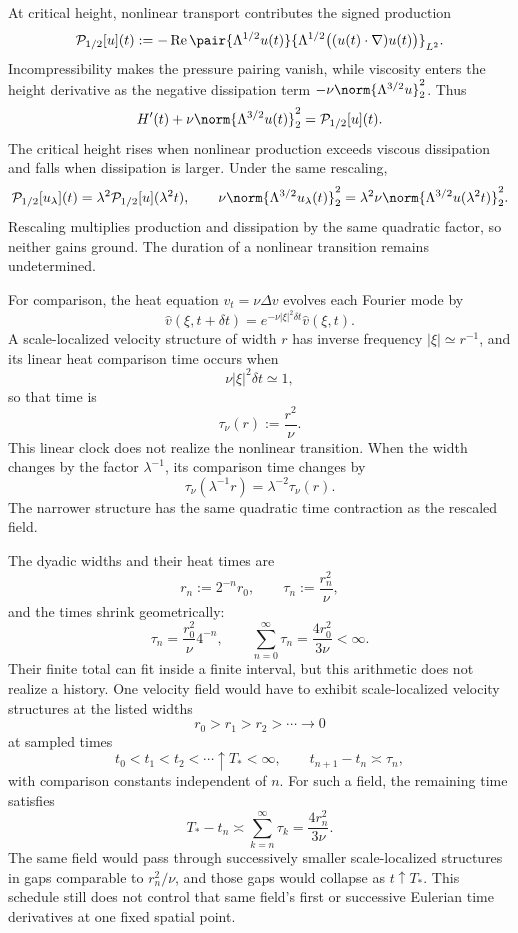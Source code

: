 
At critical height, nonlinear transport contributes the signed production
\[
  \mathcal P_{1/2}[u](t)
  :=
  -\operatorname{Re}
  \pair
    {\Lambda^{1/2}u(t)}
    {\Lambda^{1/2}\bigl((u(t)\cdot\nabla)u(t)\bigr)}_{L^2}.
\]
Incompressibility makes the pressure pairing vanish, while viscosity enters the height derivative as the negative dissipation term \(-\nu\norm{\Lambda^{3/2}u}_2^2\).
Thus
\[
  H'(t)
  +
  \nu\norm{\Lambda^{3/2}u(t)}_2^2
  =
  \mathcal P_{1/2}[u](t).
\]
The critical height rises when nonlinear production exceeds viscous dissipation and falls when dissipation is larger.
Under the same rescaling,
\[
  \mathcal P_{1/2}[u_\lambda](t)
  =
  \lambda^2\mathcal P_{1/2}[u](\lambda^2t),
  \qquad
  \nu\norm{\Lambda^{3/2}u_\lambda(t)}_2^2
  =
  \lambda^2\nu\norm{\Lambda^{3/2}u(\lambda^2t)}_2^2.
\]
Rescaling multiplies production and dissipation by the same quadratic factor, so neither gains ground.
The duration of a nonlinear transition remains undetermined.


For comparison, the heat equation \(v_t=\nu\Delta v\) evolves each Fourier mode by
\[
  \widehat v(\xi,t+\delta t)
  =
  e^{-\nu|\xi|^2\delta t}\widehat v(\xi,t).
\]
A scale-localized velocity structure of width \(r\) has inverse frequency \(|\xi|\simeq r^{-1}\), and its linear heat comparison time occurs when
\[
  \nu|\xi|^2\delta t\simeq1,
\]
so that time is
\[
  \tau_\nu(r)
  :=
  \frac{r^2}{\nu}.
\]
This linear clock does not realize the nonlinear transition.
When the width changes by the factor \(\lambda^{-1}\), its comparison time changes by
\[
  \tau_\nu(\lambda^{-1}r)
  =
  \lambda^{-2}\tau_\nu(r).
\]
The narrower structure has the same quadratic time contraction as the rescaled field.


The dyadic widths and their heat times are
\[
  r_n:=2^{-n}r_0,
  \qquad
  \tau_n:=\frac{r_n^2}{\nu},
\]
and the times shrink geometrically:
\[
  \tau_n
  =
  \frac{r_0^2}{\nu}4^{-n},
  \qquad
  \sum_{n=0}^{\infty}\tau_n
  =
  \frac{4r_0^2}{3\nu}
  <
  \infty.
\]
Their finite total can fit inside a finite interval, but this arithmetic does not realize a \NavierStokes{} history.
One \NavierStokes{} velocity field would have to exhibit scale-localized velocity structures at the listed widths
\[
  r_0>r_1>r_2>\cdots\longrightarrow0
\]
at sampled times
\[
  t_0<t_1<t_2<\cdots\uparrow T_*<\infty,
  \qquad
  t_{n+1}-t_n\asymp\tau_n,
\]
with comparison constants independent of \(n\).
For such a field, the remaining time satisfies
\[
  T_*-t_n
  \asymp
  \sum_{k=n}^{\infty}\tau_k
  =
  \frac{4r_n^2}{3\nu}.
\]
The same field would pass through successively smaller scale-localized structures in gaps comparable to \(r_n^2/\nu\), and those gaps would collapse as \(t\uparrow T_*\).
This schedule still does not control that same field's first or successive Eulerian time derivatives at one fixed spatial point.
